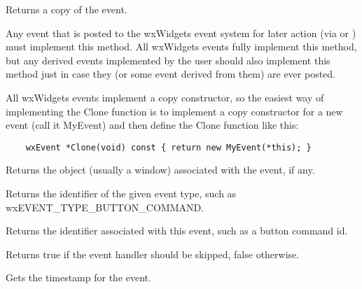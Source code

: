 \label{wxeventclone}


Returns a copy of the event.

Any event that is posted to the wxWidgets event system for later action (via
 or
) must implement this method. All wxWidgets
events fully implement this method, but any derived events implemented by the
user should also implement this method just in case they (or some event
derived from them) are ever posted.

All wxWidgets events implement a copy constructor, so the easiest way of
implementing the Clone function is to implement a copy constructor for
a new event (call it MyEvent) and then define the Clone function like this:

\begin{verbatim}
    wxEvent *Clone(void) const { return new MyEvent(*this); }
\end{verbatim}

\label{wxeventgeteventobject}


Returns the object (usually a window) associated with the
event, if any.

\label{wxeventgeteventtype}


Returns the identifier of the given event type,
such as wxEVENT\_TYPE\_BUTTON\_COMMAND.

\label{wxeventgetid}


Returns the identifier associated with this event, such as a button command id.

\label{wxeventgetskipped}


Returns true if the event handler should be skipped, false otherwise.

\label{wxeventgettimestamp}


Gets the timestamp for the event.

